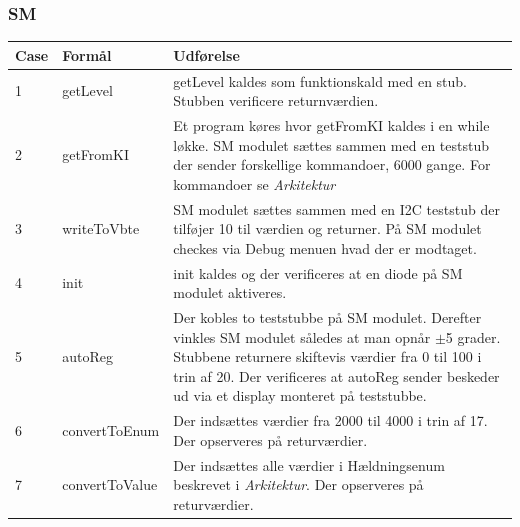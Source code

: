 \subsubsection{SM}
\begin{table}[H]
\centering
\begin{tabular}{| p{1cm}  | p{4.5cm} | p{8cm} |}
\hline
Case &Formål &Udførelse\\\hline
1 &getLevel &getLevel kaldes som funktionskald med en stub. Stubben verificere returnværdien.\\\hline
2 &getFromKI &Et program køres hvor getFromKI kaldes i en while løkke. SM modulet sættes sammen med en teststub der sender forskellige kommandoer, 6000 gange. For kommandoer se \textit{Arkitektur}\\\hline
3 &writeToVbte &SM modulet sættes sammen med en I2C teststub der tilføjer 10 til værdien og returner. På SM modulet checkes via Debug menuen hvad der er modtaget.\\\hline
4 &init &init kaldes og der verificeres at en diode på SM modulet aktiveres.\\\hline
5 &autoReg &Der kobles to teststubbe på SM modulet. Derefter vinkles SM modulet således at man opnår $\pm$5 grader. Stubbene returnere skiftevis værdier fra 0 til 100 i trin af 20. Der verificeres at autoReg sender beskeder ud via et display monteret på teststubbe.\\\hline
6 &convertToEnum &Der indsættes værdier fra 2000 til 4000 i trin af 17. Der opserveres på returværdier. \\\hline
7 &convertToValue &Der indsættes alle værdier i Hældningsenum beskrevet i \textit{Arkitektur}. Der opserveres på returværdier.\\\hline
\end{tabular}
\end{table}
